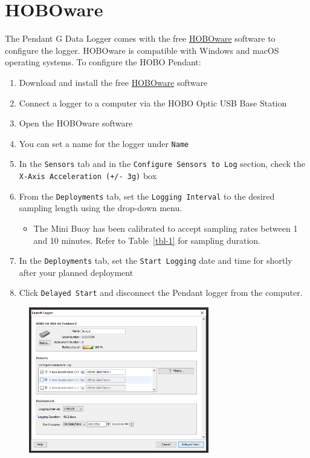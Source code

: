 \documentclass[
  letterpaper,
  DIV=11,
  numbers=noendperiod]{scrreprt}
\providecommand{\tightlist}{%
  \setlength{\itemsep}{0pt}\setlength{\parskip}{0pt}}\usepackage{longtable,booktabs,array}
\begin{document}
\hypertarget{hoboware}{%
\section{HOBOware}\label{hoboware}}

The Pendant G Data Logger comes with the free
\href{https://www.onsetcomp.com/hoboware-free-download/}{HOBOware}
software to configure the logger. HOBOware is compatible with Windows
and macOS operating systems. To configure the HOBO Pendant:

\begin{enumerate}
\def\labelenumi{\arabic{enumi}.}
\tightlist
\item
  Download and install the free
  \href{https://www.onsetcomp.com/hoboware-free-download/}{HOBOware}
  software
\item
  Connect a logger to a computer via the HOBO Optic USB Base Station
\item
  Open the HOBOware software
\item
  You can set a name for the logger under \texttt{Name}
\item
  In the \texttt{Sensors} tab and in the
  \texttt{Configure\ Sensors\ to\ Log} section, check the
  \texttt{X-Axis\ Acceleration\ (+/-\ 3g)} box
\item
  From the \texttt{Deployments} tab, set the \texttt{Logging\ Interval}
  to the desired sampling length using the drop-down menu.

  \begin{itemize}
  \tightlist
  \item
    The Mini Buoy has been calibrated to accept sampling rates between 1
    and 10 minutes. Refer to Table~\ref{tbl-1} for sampling duration.
  \end{itemize}
\item
  In the \texttt{Deployments} tab, set the \texttt{Start\ Logging} date
  and time for shortly after your planned deployment\\
\item
  Click \texttt{Delayed\ Start} and disconnect the Pendant logger from
  the computer.
\end{enumerate}

\begin{figure}

{\centering \includegraphics[width=0.7\textwidth,height=\textheight]{chapters/figs/HOBOStep1.png}

}

\end{figure}
\end{document}
